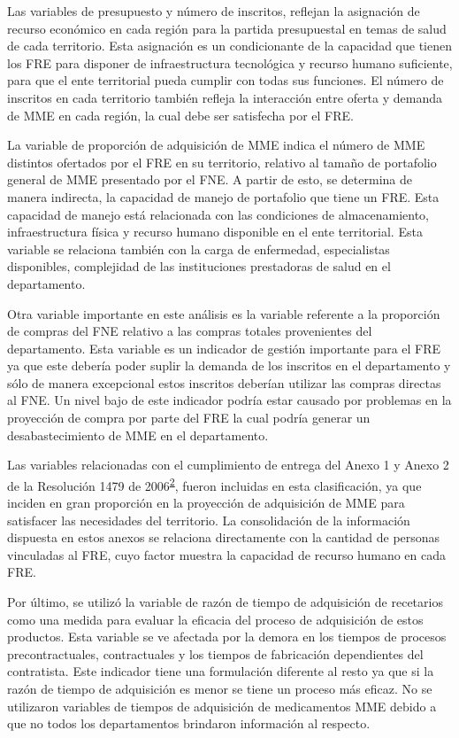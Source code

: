 \documentclass[
]{book}
\begin{document}
Las variables de presupuesto y número de inscritos, reflejan la asignación de recurso económico en cada región para la partida presupuestal en temas de salud de cada territorio. Esta asignación es un condicionante de la capacidad que tienen los FRE para disponer de infraestructura tecnológica y recurso humano suficiente, para que el ente territorial pueda cumplir con todas sus funciones. El número de inscritos en cada territorio también refleja la interacción entre oferta y demanda de MME en cada región, la cual debe ser satisfecha por el FRE.

La variable de proporción de adquisición de MME indica el número de MME distintos ofertados por el FRE en su territorio, relativo al tamaño de portafolio general de MME presentado por el FNE. A partir de esto, se determina de manera indirecta, la capacidad de manejo de portafolio que tiene un FRE. Esta capacidad de manejo está relacionada con las condiciones de almacenamiento, infraestructura física y recurso humano disponible en el ente territorial. Esta variable se relaciona también con la carga de enfermedad, especialistas disponibles, complejidad de las instituciones prestadoras de salud en el departamento.

Otra variable importante en este análisis es la variable referente a la proporción de compras del FNE relativo a las compras totales provenientes del departamento. Esta variable es un indicador de gestión importante para el FRE ya que este debería poder suplir la demanda de los inscritos en el departamento y sólo de manera excepcional estos inscritos deberían utilizar las compras directas al FNE. Un nivel bajo de este indicador podría estar causado por problemas en la proyección de compra por parte del FRE la cual podría generar un desabastecimiento de MME en el departamento.

Las variables relacionadas con el cumplimiento de entrega del Anexo 1 y Anexo 2 de la Resolución 1479 de 2006\textsuperscript{\protect\hyperlink{ref-MSPS1479-2006}{2}}, fueron incluidas en esta clasificación, ya que inciden en gran proporción en la proyección de adquisición de MME para satisfacer las necesidades del territorio. La consolidación de la información dispuesta en estos anexos se relaciona directamente con la cantidad de personas vinculadas al FRE, cuyo factor muestra la capacidad de recurso humano en cada FRE.

Por último, se utilizó la variable de razón de tiempo de adquisición de recetarios como una medida para evaluar la eficacia del proceso de adquisición de estos productos. Esta variable se ve afectada por la demora en los tiempos de procesos precontractuales, contractuales y los tiempos de fabricación dependientes del contratista. Este indicador tiene una formulación diferente al resto ya que si la razón de tiempo de adquisición es menor se tiene un proceso más eficaz. No se utilizaron variables de tiempos de adquisición de medicamentos MME debido a que no todos los departamentos brindaron información al respecto.
\end{document}
